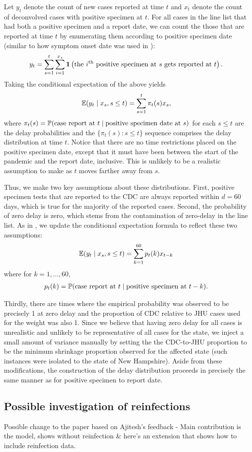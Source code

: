 \documentclass{article}
\begin{document}
Let $y_t$ denote the count of new cases reported at time $t$ and $x_t$ denote
the count of deconvolved cases with positive specimen at $t$. For all cases in
the line list that had both a positive specimen and a report date, we can count
the those that are reported at time $t$ by enumerating them according to
positive specimen date (similar to how symptom onset date was used in
\citealp{jahja2022real}):
\begin{align*}
y_t = \sum_{s=1}^{t} \sum_{i=1}^{x_s}\indicator \left ( \text{the }i\th\text{ positive specimen at }
    s \text{ gets reported at }t \right ).
\end{align*}
Taking the conditional expectation of the above yields
\begin{align*}
\E(y_t \mid x_s, s \leq t) = \sum_{s=1}^{t} \pi_t(s) x_s ,
\end{align*}
where $\pi_t(s) = \P(\text{case report at }t \mid \text{positive specimen date
at }s)$ for each $s \leq t$ are the delay probabilities and the $\{ \pi_t(s) : s
\leq t \}$ sequence comprises the delay distribution at time $t$. Notice that
there are no time restrictions placed on the positive specimen date, except that
it must have been between the start of the pandemic and the report date,
inclusive. This is unlikely to be a realistic assumption to make as $t$ moves
farther away from $s$. 

Thus, we make two key assumptions about these distributions. First, positive
specimen tests that are reported to the CDC are always reported within $d = 60$
days, which is true for the majority of the reported cases. Second, the
probability of zero delay is zero, which stems from the contamination of
zero-delay in the line list. As in \citet{jahja2022real}, we update the
conditional expectation formula to reflect these two assumptions: 
\begin{align*}
\E(y_t \mid x_s, s \leq t) = \sum_{k=1}^{60} p_t(k) x_{t-k}
\end{align*}
where for $k = 1, \dots, 60$,
\begin{align*}
p_t(k) = \P(\text{case report at }t \mid \text{positive specimen at }t-k).
\end{align*}


Thirdly, there are times where the empirical probability
was observed to be precisely 1 at zero delay and the proportion of CDC relative
to JHU cases used for the weight was also 1. Since we believe that having zero
delay for all cases is unrealistic and unlikely to be representative of all
cases for the state, we inject a small amount of variance manually by setting
the the CDC-to-JHU proportion to be the minimum shrinkage proportion observed
for the affected state (such instances were isolated to the state of New
Hampshire). Aside from these modifications, the construction of the delay
distribution proceeds in precisely the same manner as for positive specimen to
report date. 



\subsection{Possible investigation of reinfections}

Possible change to the paper based on Ajitesh's feedback - 
Main contribution is the model, shows without reinfection 
\& here's an extension that shows how to include reinfection data. 
\end{document}
